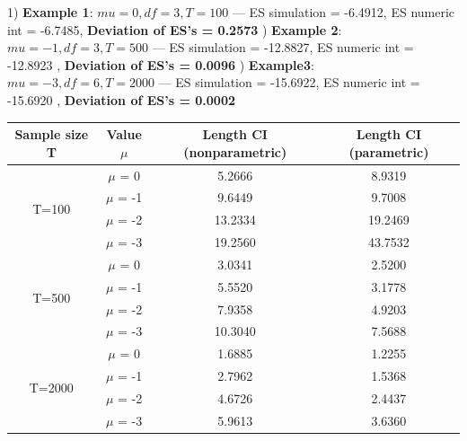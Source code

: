 \documentclass[12pt]{article}
\begin{document}
1) \textbf{Example 1}: $mu = 0, df = 3, T = 100$     \newline ---     ES simulation = -6.4912, ES numeric int = -6.7485,  \textbf{Deviation of ES's = 0.2573}  ) \textbf{Example 2}: $mu = -1, df =3, T = 500$ \newline --- ES simulation = -12.8827, ES numeric int = -12.8923 , \textbf{Deviation of ES's = 0.0096} ) \textbf{Example3}: $mu = -3, df = 6, T = 2000$  \newline--- ES simulation = -15.6922, ES numeric int = -15.6920 , \textbf{Deviation of ES's = 0.0002}\newline\newline

\begin{center}
\begin{tabular}{||c | c | c c||} 
 \hline
 Sample size T & Value $\mu$ & Length CI (nonparametric) & Length CI (parametric) \\ [0.5ex] 
 \hline\hline
 \multirow{4}{4em}{T=100} & $\mu$ = 0 & 5.2666 & 8.9319\\ 
& $\mu$ = -1 & 9.6449 & 9.7008 \\ 
& $\mu$ = -2 & 13.2334 & 19.2469 \\ 
& $\mu$ = -3 & 19.2560 & 43.7532 \\ 
 \hline
 \multirow{4}{4em}{T=500} & $\mu$ = 0 & 3.0341 & 2.5200\\ 
& $\mu$ = -1 & 5.5520 & 3.1778 \\ 
& $\mu$ = -2 & 7.9358 & 4.9203 \\ 
& $\mu$ = -3 & 10.3040 & 7.5688 \\ 
 \hline
 \multirow{4}{4em}{T=2000} & $\mu$ = 0 & 1.6885 & 1.2255\\ 
& $\mu$ = -1 & 2.7962 & 1.5368 \\ 
& $\mu$ = -2 & 4.6726 & 2.4437 \\ 
& $\mu$ = -3 & 5.9613 & 3.6360 \\ 
 \hline
\end{tabular}
\end{center}
\end{document}
